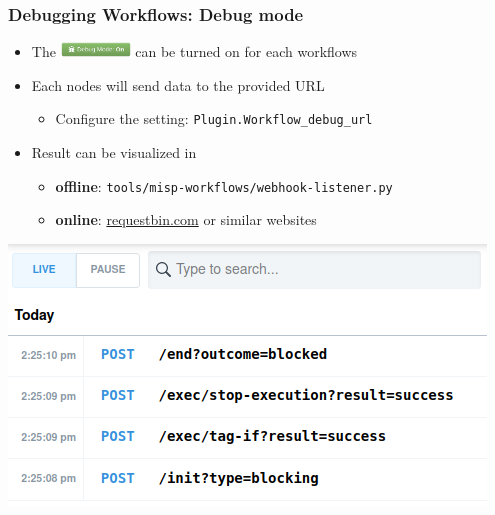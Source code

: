 \begin{frame}
    \frametitle{Debugging Workflows: Debug mode}
    \begin{itemize}
        \item The \includegraphics[width=70px]{pictures/debug-mode.png} can be turned on for each workflows
        \item Each nodes will send data to the provided URL
        \begin{itemize}
            \item Configure the setting: \texttt{Plugin.Workflow\_debug\_url}
        \end{itemize}
        \item Result can be visualized in
        \begin{itemize}
            \item \textbf{offline}: \texttt{tools/misp-workflows/webhook-listener.py}
            \item \textbf{online}: \url{requestbin.com} or similar websites
        \end{itemize}
    \end{itemize}
    \begin{center}
        \includegraphics[width=0.6\linewidth]{pictures/request-bin.png}
    \end{center}
\end{frame}

